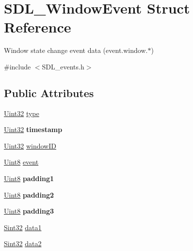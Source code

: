 \hypertarget{struct_s_d_l___window_event}{}\section{S\+D\+L\+\_\+\+Window\+Event Struct Reference}
\label{struct_s_d_l___window_event}


Window state change event data (event.\+window.$\ast$)  




{\ttfamily \#include $<$S\+D\+L\+\_\+events.\+h$>$}

\subsection*{Public Attributes}
\begin{DoxyCompactItemize}
\item 
\hyperlink{_s_d_l__stdinc_8h_add440eff171ea5f55cb00c4a9ab8672d}{Uint32} \hyperlink{struct_s_d_l___window_event_a01c8c8fbe8564e690f958d2db560f657}{type}
\item 
\hypertarget{struct_s_d_l___window_event_a7b0bf569b20cfa4e3fb76e3301d616f9}{}\hyperlink{_s_d_l__stdinc_8h_add440eff171ea5f55cb00c4a9ab8672d}{Uint32} {\bfseries timestamp}\label{struct_s_d_l___window_event_a7b0bf569b20cfa4e3fb76e3301d616f9}

\item 
\hyperlink{_s_d_l__stdinc_8h_add440eff171ea5f55cb00c4a9ab8672d}{Uint32} \hyperlink{struct_s_d_l___window_event_a4b31796ffc84fbb7f6e9ba33e127619a}{window\+I\+D}
\item 
\hyperlink{_s_d_l__stdinc_8h_a2944638813a090aa23e62f4da842c3e2}{Uint8} \hyperlink{struct_s_d_l___window_event_a485cd1f07f0f22fdb9f4c4bf214011dc}{event}
\item 
\hypertarget{struct_s_d_l___window_event_a09ee59114246eceed4a281033ec6609b}{}\hyperlink{_s_d_l__stdinc_8h_a2944638813a090aa23e62f4da842c3e2}{Uint8} {\bfseries padding1}\label{struct_s_d_l___window_event_a09ee59114246eceed4a281033ec6609b}

\item 
\hypertarget{struct_s_d_l___window_event_a6bcf773b690b894e8c04c591826d0c8a}{}\hyperlink{_s_d_l__stdinc_8h_a2944638813a090aa23e62f4da842c3e2}{Uint8} {\bfseries padding2}\label{struct_s_d_l___window_event_a6bcf773b690b894e8c04c591826d0c8a}

\item 
\hypertarget{struct_s_d_l___window_event_ac352263b5fa4ba6dbd64a48062d5e29f}{}\hyperlink{_s_d_l__stdinc_8h_a2944638813a090aa23e62f4da842c3e2}{Uint8} {\bfseries padding3}\label{struct_s_d_l___window_event_ac352263b5fa4ba6dbd64a48062d5e29f}

\item 
\hyperlink{_s_d_l__stdinc_8h_a7a90b941db9d4582e9ad7abb9940ff7e}{Sint32} \hyperlink{struct_s_d_l___window_event_a01da0025428d3434c80021f3e4089fec}{data1}
\item 
\hyperlink{_s_d_l__stdinc_8h_a7a90b941db9d4582e9ad7abb9940ff7e}{Sint32} \hyperlink{struct_s_d_l___window_event_af6cd0a21bc9ecadfee42f6a0147d7171}{data2}
\end{DoxyCompactItemize}


